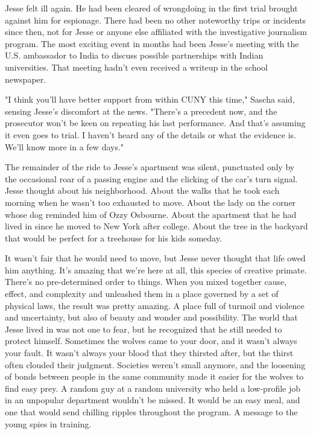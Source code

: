 Jesse felt ill again.  He had been cleared of wrongdoing in the first trial brought against him for espionage.  There had been no other noteworthy trips or incidents since then, not for Jesse or anyone else affiliated with the investigative journalism program.  The most exciting event in months had been Jesse's meeting with the U.S. ambassador to India to discuss possible partnerships with Indian universities.  That meeting hadn't even received a writeup in the school newspaper.

"I think you'll have better support from within CUNY this time," Sascha said, sensing Jesse's discomfort at the news.  "There's a precedent now, and the prosecutor won't be keen on repeating his last performance.  And that's assuming it even goes to trial.  I haven't heard any of the details or what the evidence is.  We'll know more in a few days."

The remainder of the ride to Jesse's apartment was silent, punctuated only by the occasional roar of a passing engine and the clicking of the car's turn signal.  Jesse thought about his neighborhood.  About the walks that he took each morning when he wasn't too exhausted to move.  About the lady on the corner whose dog reminded him of Ozzy Osbourne.  About the apartment that he had lived in since he moved to New York after college.  About the tree in the backyard that would be perfect for a treehouse for his kids someday.

It wasn't fair that he would need to move, but Jesse never thought that life owed him anything.  It's amazing that we're here at all, this species of creative primate.  There's no pre-determined order to things.  When you mixed together cause, effect, and complexity and unleashed them in a place governed by a set of physical laws, the result was pretty amazing.  A place full of turmoil and violence and uncertainty, but also of beauty and wonder and possibility.  The world that Jesse lived in was not one to fear, but he recognized that he still needed to protect himself.  Sometimes the wolves came to your door, and it wasn't always your fault.  It wasn't always your blood that they thirsted after, but the thirst often clouded their judgment.  Societies weren't small anymore, and the loosening of bonds between people in the same community made it easier for the wolves to find easy prey.  A random guy at a random university who held a low-profile job in an unpopular department wouldn't be missed.  It would be an easy meal, and one that would send chilling ripples throughout the program.  A message to the young spies in training.

